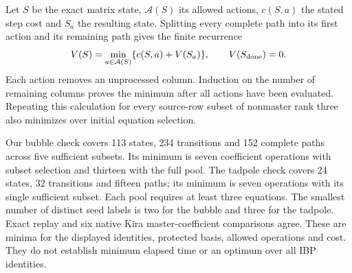 Let $S$ be the exact matrix state, $\mathcal A(S)$ its allowed actions, $c(S,a)$ the stated step cost and $S_a$ the resulting state. Splitting every complete path into its first action and its remaining path gives the finite recurrence~\cite{Bellman1952}
\begin{equation}
 V(S)=\min_{a\in\mathcal A(S)}\{c(S,a)+V(S_a)\},
 \qquad V(S_{\rm done})=0.
\end{equation}
Each action removes an unprocessed column. Induction on the number of remaining columns proves the minimum after all actions have been evaluated. Repeating this calculation for every source-row subset of nonmaster rank three also minimizes over initial equation selection.

Our bubble check covers 113 states, 234 transitions and 152 complete paths across five sufficient subsets. Its minimum is seven coefficient operations with subset selection and thirteen with the full pool. The tadpole check covers 24 states, 32 transitions and fifteen paths; its minimum is seven operations with its single sufficient subset. Each pool requires at least three equations. The smallest number of distinct seed labels is two for the bubble and three for the tadpole. Exact replay and six native Kira master-coefficient comparisons agree. These are minima for the displayed identities, protected basis, allowed operations and cost. They do not establish minimum elapsed time or an optimum over all IBP identities.
